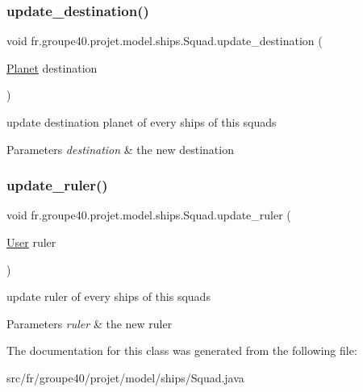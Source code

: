\subsubsection{\texorpdfstring{update\+\_\+destination()}{update\_destination()}}
{\footnotesize\ttfamily void fr.\+groupe40.\+projet.\+model.\+ships.\+Squad.\+update\+\_\+destination (\begin{DoxyParamCaption}\item[{\hyperlink{classfr_1_1groupe40_1_1projet_1_1model_1_1planets_1_1_planet}{Planet}}]{destination }\end{DoxyParamCaption})}



update destination planet of every ships of this squads 


\begin{DoxyParams}{Parameters}
{\em destination} & the new destination \\
\hline
\end{DoxyParams}
\mbox{\label{classfr_1_1groupe40_1_1projet_1_1model_1_1ships_1_1_squad_adaf147d0fd3649c1bf3172c9fd77f096}} 
\subsubsection{\texorpdfstring{update\+\_\+ruler()}{update\_ruler()}}
{\footnotesize\ttfamily void fr.\+groupe40.\+projet.\+model.\+ships.\+Squad.\+update\+\_\+ruler (\begin{DoxyParamCaption}\item[{\hyperlink{classfr_1_1groupe40_1_1projet_1_1client_1_1_user}{User}}]{ruler }\end{DoxyParamCaption})}



update ruler of every ships of this squads 


\begin{DoxyParams}{Parameters}
{\em ruler} & the new ruler \\
\hline
\end{DoxyParams}


The documentation for this class was generated from the following file\+:\begin{DoxyCompactItemize}
\item 
src/fr/groupe40/projet/model/ships/Squad.\+java\end{DoxyCompactItemize}
